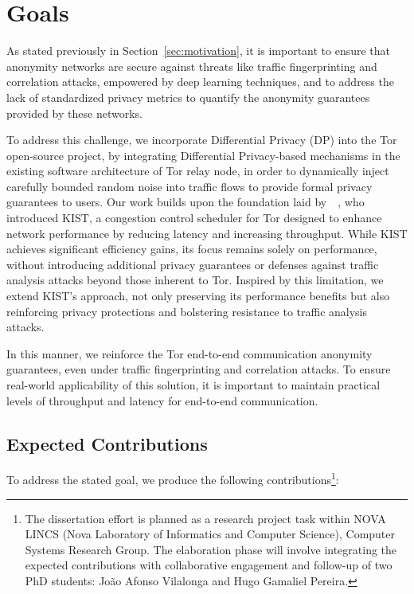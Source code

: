 \section{Goals}\label{sec:goals}

As stated previously in Section~\ref{sec:motivation}, it is important to ensure that anonymity networks are secure against threats like traffic fingerprinting and correlation attacks, empowered by deep learning techniques, and to address the lack of standardized privacy metrics to quantify the anonymity guarantees provided by these networks.

To address this challenge, we incorporate Differential Privacy (DP) into the Tor open-source project, by integrating Differential Privacy-based mechanisms in the existing software architecture of Tor relay node, in order to dynamically inject carefully bounded random noise into traffic flows to provide formal privacy guarantees to users. 
Our work builds upon the foundation laid by~\citeauthor{KIST}~\cite{KIST}, who introduced KIST, a congestion control scheduler for Tor designed to enhance network performance by reducing latency and increasing throughput. While KIST achieves significant efficiency gains, its focus remains solely on performance, without introducing additional privacy guarantees or defenses against traffic analysis attacks beyond those inherent to Tor. Inspired by this limitation, we extend KIST's approach, not only preserving its performance benefits but also reinforcing privacy protections and bolstering resistance to traffic analysis attacks.

In this manner, we reinforce the Tor end-to-end communication anonymity guarantees, even under traffic fingerprinting and correlation attacks. To ensure real-world applicability of this solution, it is important to maintain practical levels of throughput and latency for end-to-end communication. 

\subsection{Expected Contributions}\label{sub:contributions}

To address the stated goal, we produce the following contributions\footnote{The dissertation effort is planned as a research project task within NOVA LINCS (Nova Laboratory of Informatics and Computer Science), Computer Systems Research Group. The elaboration phase will involve integrating the expected contributions with collaborative engagement and follow-up of two PhD students: João Afonso Vilalonga and Hugo Gamaliel Pereira.}:

